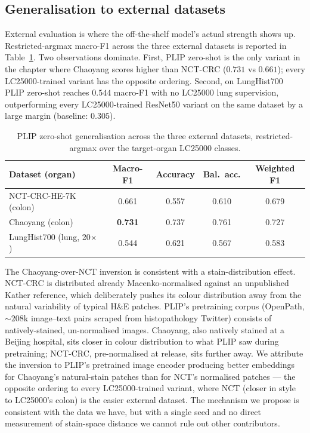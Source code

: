 \subsection{Generalisation to external datasets}

External evaluation is where the off-the-shelf model's actual strength shows up. Restricted-argmax macro-F1 across the three external datasets is reported in Table~\ref{tab:plip-zeroshot-ood}. Two observations dominate. First, PLIP zero-shot is the only variant in the chapter where Chaoyang scores higher than NCT-CRC ($0.731$ vs $0.661$); every LC25000-trained variant has the opposite ordering. Second, on LungHist700 PLIP zero-shot reaches $0.544$ macro-F1 with no LC25000 lung supervision, outperforming every LC25000-trained ResNet50 variant on the same dataset by a large margin (baseline: $0.305$).

\begin{table}[H]
    \centering
    \small
    \begin{tabular}{|l|c|c|c|c|}
    \hline
    \textbf{Dataset (organ)} & \textbf{Macro-F1} & \textbf{Accuracy} & \textbf{Bal.\ acc.} & \textbf{Weighted F1} \\ \hline
    NCT-CRC-HE-7K (colon)            & 0.661 & 0.557 & 0.610 & 0.679 \\ \hline
    Chaoyang (colon)                 & \textbf{0.731} & 0.737 & 0.761 & 0.727 \\ \hline
    LungHist700 (lung, 20$\times$)   & 0.544 & 0.621 & 0.567 & 0.583 \\ \hline
    \end{tabular}
    \caption{PLIP zero-shot generalisation across the three external datasets, restricted-argmax over the target-organ LC25000 classes.}
    \label{tab:plip-zeroshot-ood}
\end{table}

The Chaoyang-over-NCT inversion is consistent with a stain-distribution effect. NCT-CRC is distributed already Macenko-normalised against an unpublished Kather reference, which deliberately pushes its colour distribution away from the natural variability of typical H\&E patches. PLIP's pretraining corpus (OpenPath, $\sim 208\text{k}$ image--text pairs scraped from histopathology Twitter) consists of natively-stained, un-normalised images. Chaoyang, also natively stained at a Beijing hospital, sits closer in colour distribution to what PLIP saw during pretraining; NCT-CRC, pre-normalised at release, sits further away. We attribute the inversion to PLIP's pretrained image encoder producing better embeddings for Chaoyang's natural-stain patches than for NCT's normalised patches --- the opposite ordering to every LC25000-trained variant, where NCT (closer in style to LC25000's colon) is the easier external dataset. The mechanism we propose is consistent with the data we have, but with a single seed and no direct measurement of stain-space distance we cannot rule out other contributors.

